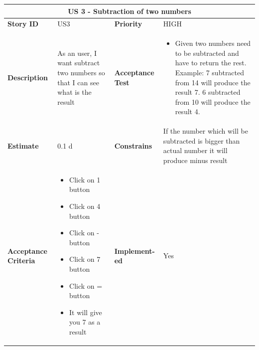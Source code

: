 \documentclass{article}
\begin{document}
\begin{tabular}{ |p{2cm}|p{5cm}|p{2cm}|p{4cm}| }
 \hline
 \multicolumn{4}{|c|}{US 3 - Subtraction of two numbers} \\
 \hline
 \textbf {Story ID}& US3 &  \textbf{Priority} & HIGH \\
 \hline
  \textbf{Description}   & As an user, I want subtract two numbers so that I can see what is the result &    \textbf{Acceptance Test}& 
\begin{itemize}
\item Given two numbers need to be subtracted and have to return the rest. Example: 7 subtracted from 14 will produce the result 7. 6 subtracted from 10 will produce the result 4. 
\end{itemize}
  \\
 \hline
 \textbf{Estimate} & 0.1 d &  \textbf{Constrains}&  If the number which will be subtracted is bigger than actual number it will produce minus result  \\
 \hline
 \textbf{Acceptance Criteria} & 
 \begin{itemize}
\item Click on 1 button
\item Click on 4 button
\item Click on - button
\item Click on 7 button
\item Click on = button
\item It will give you 7 as a result 
\end{itemize}
 &  \textbf{Implement- ed}& Yes  \\
 \hline
\end{tabular}
\end{document}
